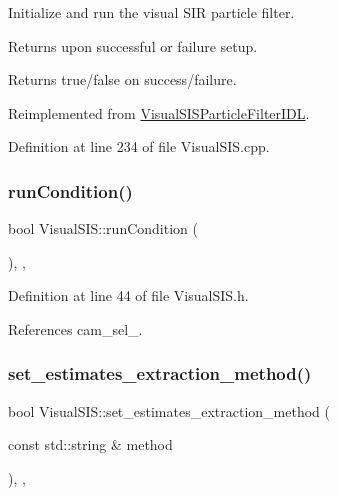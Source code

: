Initialize and run the visual S\+IR particle filter. 

Returns upon successful or failure setup. \begin{DoxyReturn}{Returns}
true/false on success/failure. 
\end{DoxyReturn}


Reimplemented from \hyperlink{classVisualSISParticleFilterIDL_a6a8c16192597ea78617f10691b07df08}{Visual\+S\+I\+S\+Particle\+Filter\+I\+DL}.



Definition at line 234 of file Visual\+S\+I\+S.\+cpp.

\mbox{\label{classVisualSIS_af053d8966ebebac8bf8eb8cfce4e4903}} 
\subsubsection{\texorpdfstring{run\+Condition()}{runCondition()}}
{\footnotesize\ttfamily bool Visual\+S\+I\+S\+::run\+Condition (\begin{DoxyParamCaption}{ }\end{DoxyParamCaption})\hspace{0.3cm}{\ttfamily [inline]}, {\ttfamily [override]}, {\ttfamily [protected]}}



Definition at line 44 of file Visual\+S\+I\+S.\+h.



References cam\+\_\+sel\+\_\+.

\mbox{\label{classVisualSIS_ab45998859ed6c115eb0a8446f94c764e}} 
\subsubsection{\texorpdfstring{set\+\_\+estimates\+\_\+extraction\+\_\+method()}{set\_estimates\_extraction\_method()}}
{\footnotesize\ttfamily bool Visual\+S\+I\+S\+::set\+\_\+estimates\+\_\+extraction\+\_\+method (\begin{DoxyParamCaption}\item[{const std\+::string \&}]{method }\end{DoxyParamCaption})\hspace{0.3cm}{\ttfamily [override]}, {\ttfamily [protected]}, {\ttfamily [virtual]}}




